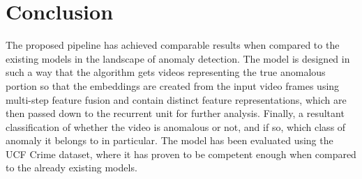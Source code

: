 \documentclass[runningheads]{llncs}
\begin{document}
\section{Conclusion}
The proposed pipeline has achieved comparable results when compared to the existing models in the landscape of anomaly detection. The model is designed in such a way that the algorithm gets videos representing the true anomalous portion so that the embeddings are created from the input video frames using multi-step feature fusion and contain distinct feature representations, which are then passed down to the recurrent unit for further analysis. Finally, a resultant classification of whether the video is anomalous or not, and if so, which class of anomaly it belongs to in particular. The model has been evaluated using the UCF Crime dataset, where it has proven to be competent enough when compared to the already existing models.
\end{document}
